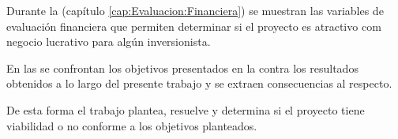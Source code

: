 Durante la \emph{} (capítulo \ref{cap:Evaluacion:Financiera}) se muestran las variables de evaluación financiera que permiten determinar si el proyecto es atractivo com negocio lucrativo para algún inversionista.

En las \emph{} se confrontan los objetivos presentados en la  contra los resultados obtenidos a lo largo del presente trabajo y se extraen consecuencias al respecto.

De esta forma el trabajo plantea, resuelve y determina si el proyecto tiene viabilidad o no conforme a los objetivos planteados.
